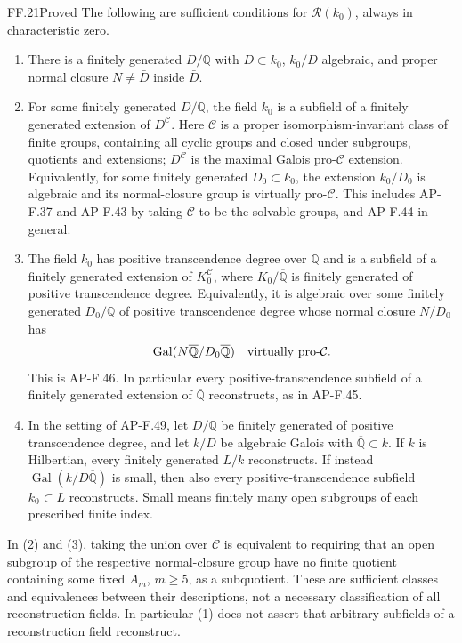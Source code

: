 \begin{claim}{FF.21}{Proved}\label{clm:FFclasses}
The following are sufficient conditions for \(\mathcal R(k_0)\),
always in characteristic zero.
\begin{enumerate}
\item There is a finitely generated \(D/\mathbb Q\) with
\(D\subset k_0\), \(k_0/D\) algebraic, and proper normal
closure \(N\ne\bar D\) inside \(\bar D\).
\item For some finitely generated \(D/\mathbb Q\), the field
\(k_0\) is a subfield of a finitely generated extension of
\(D^{\mathcal C}\). Here \(\mathcal C\) is a proper
isomorphism-invariant class of finite groups, containing all
cyclic groups and closed under subgroups, quotients and
extensions; \(D^{\mathcal C}\) is the maximal Galois
pro-\(\mathcal C\) extension. Equivalently, for some finitely
generated \(D_0\subset k_0\), the extension \(k_0/D_0\)
is algebraic and its normal-closure group is virtually
pro-\(\mathcal C\). This includes AP-F.37 and AP-F.43
by taking \(\mathcal C\) to be the solvable groups, and
AP-F.44 in general.
\item The field \(k_0\) has positive transcendence degree
over \(\mathbb Q\) and is a subfield of a finitely generated
extension of \(K_0^{\mathcal C}\), where
\(K_0/\overline{\mathbb Q}\) is finitely generated of
positive transcendence degree. Equivalently, it is algebraic
over some finitely generated \(D_0/\mathbb Q\) of positive
transcendence degree whose normal closure \(N/D_0\) has
\[
 \operatorname{Gal}
       (N\overline{\mathbb Q}/D_0\overline{\mathbb Q})
       \quad\hbox{virtually pro-}\mathcal C.
\]
This is AP-F.46. In particular every positive-transcendence
subfield of a finitely generated extension of
\(\overline{\mathbb Q}\) reconstructs, as in AP-F.45.
\item In the setting of AP-F.49, let \(D/\mathbb Q\)
be finitely generated of positive transcendence degree, and
let \(k/D\) be algebraic Galois with
\(\overline{\mathbb Q}\subset k\). If \(k\) is
Hilbertian, every finitely generated \(L/k\) reconstructs.
If instead
\(\operatorname{Gal}(k/D\overline{\mathbb Q})\) is
small, then also every positive-transcendence subfield
\(k_0\subset L\) reconstructs. Small means finitely many
open subgroups of each prescribed finite index.
\end{enumerate}
In (2) and (3), taking the union over \(\mathcal C\) is
equivalent to requiring that an open subgroup of the respective
normal-closure group have no finite quotient containing some
fixed \(A_m\), \(m\ge5\), as a subquotient.
These are sufficient classes and equivalences between their
descriptions, not a necessary classification of all reconstruction
fields. In particular (1) does not assert that arbitrary subfields
of a reconstruction field reconstruct.
\end{claim}
